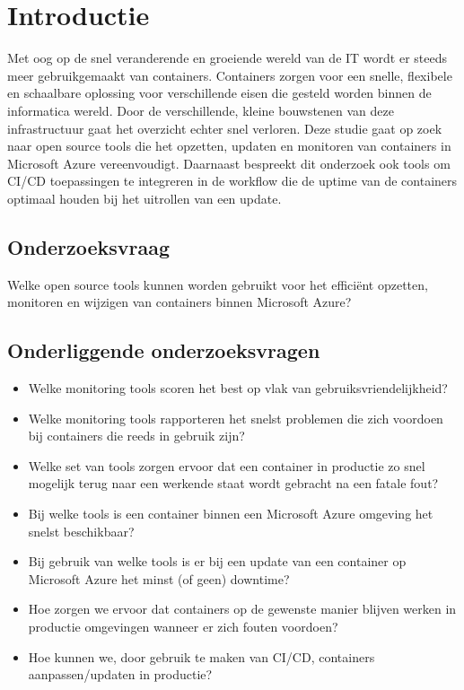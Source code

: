 
\section{Introductie} %
\label{sec:introductie}
Met oog op de snel veranderende en groeiende wereld van de IT wordt er steeds meer gebruikgemaakt van containers. Containers zorgen voor een snelle, flexibele en schaalbare oplossing voor verschillende  eisen die gesteld worden binnen de informatica wereld. Door de verschillende, kleine bouwstenen van deze infrastructuur gaat het overzicht echter snel verloren. Deze studie gaat op zoek naar open source tools die het opzetten, updaten en monitoren van containers in Microsoft Azure vereenvoudigt. Daarnaast bespreekt dit onderzoek ook tools om CI/CD toepassingen te integreren in de workflow die de uptime van de containers optimaal houden bij het uitrollen van een update.
\subsection{Onderzoeksvraag}
Welke open source tools kunnen worden gebruikt voor het efficiënt opzetten, monitoren en wijzigen van containers binnen Microsoft Azure?
\subsection{Onderliggende onderzoeksvragen}
\begin{itemize}
    \item Welke monitoring tools scoren het best op vlak van gebruiksvriendelijkheid?
    \item Welke monitoring tools rapporteren het snelst problemen die zich voordoen bij containers die reeds in gebruik zijn?
    \item Welke set van tools zorgen ervoor dat een container in productie zo snel mogelijk terug naar een werkende staat wordt gebracht na een fatale fout?
    \item Bij welke tools is een container binnen een Microsoft Azure omgeving het snelst beschikbaar?
    \item Bij gebruik van welke tools is er bij een update van een container op Microsoft Azure het minst (of geen) downtime?
    \item Hoe zorgen we ervoor dat containers op de gewenste manier blijven werken in productie omgevingen wanneer er zich fouten voordoen?
    \item Hoe kunnen we, door gebruik te maken van CI/CD, containers aanpassen/updaten in productie?
\end{itemize}


